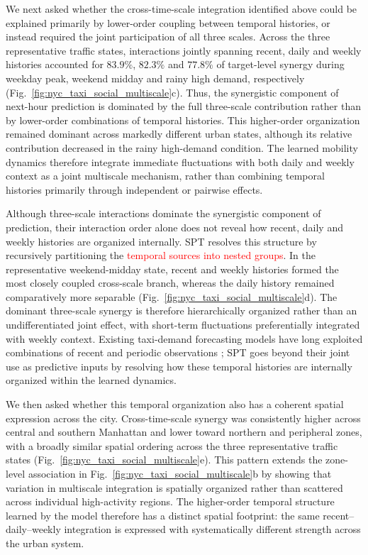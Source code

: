 \documentclass[fleqn,10pt]{wlscirep}
\newcommand{\rev}[1]{\textcolor{red}{#1}}
\theoremstyle{naturetheorem}
\begin{document}
We next asked whether the cross-time-scale integration identified above could be explained primarily by lower-order coupling between temporal histories, or instead required the joint participation of all three scales. Across the three representative traffic states, interactions jointly spanning recent, daily and weekly histories accounted for $83.9\%$, $82.3\%$ and $77.8\%$ of target-level synergy during weekday peak, weekend midday and rainy high demand, respectively (Fig.~\ref{fig:nyc_taxi_social_multiscale}c). Thus, the synergistic component of next-hour prediction is dominated by the full three-scale contribution rather than by lower-order combinations of temporal histories. This higher-order organization remained dominant across markedly different urban states, although its relative contribution decreased in the rainy high-demand condition. The learned mobility dynamics therefore integrate immediate fluctuations with both daily and weekly context as a joint multiscale mechanism, rather than combining temporal histories primarily through independent or pairwise effects.

Although three-scale interactions dominate the synergistic component of prediction, their interaction order alone does not reveal how recent, daily and weekly histories are organized internally. SPT resolves this structure by recursively partitioning the %
\rev{temporal sources into nested groups}. In the representative weekend-midday state, recent and weekly histories formed the most closely coupled cross-scale branch, whereas the daily history remained comparatively more separable (Fig.~\ref{fig:nyc_taxi_social_multiscale}d). The dominant three-scale synergy is therefore hierarchically organized rather than an undifferentiated joint effect, with short-term fluctuations preferentially integrated with weekly context. Existing taxi-demand forecasting models have long exploited combinations of recent and periodic observations \cite{Yao2018DMVST,Yang2021DualTemporal}; SPT goes beyond their joint use as predictive inputs by resolving how these temporal histories are internally organized within the learned dynamics.

We then asked whether this temporal organization also has a coherent spatial expression across the city. Cross-time-scale synergy was consistently higher across central and southern Manhattan and lower toward northern and peripheral zones, with a broadly similar spatial ordering across the three representative traffic states (Fig.~\ref{fig:nyc_taxi_social_multiscale}e). This pattern extends the zone-level association in Fig.~\ref{fig:nyc_taxi_social_multiscale}b by showing that variation in multiscale integration is spatially organized rather than scattered across individual high-activity regions. The higher-order temporal structure learned by the model therefore has a distinct spatial footprint: the same recent--daily--weekly integration is expressed with systematically different strength across the urban system.
\end{document}

